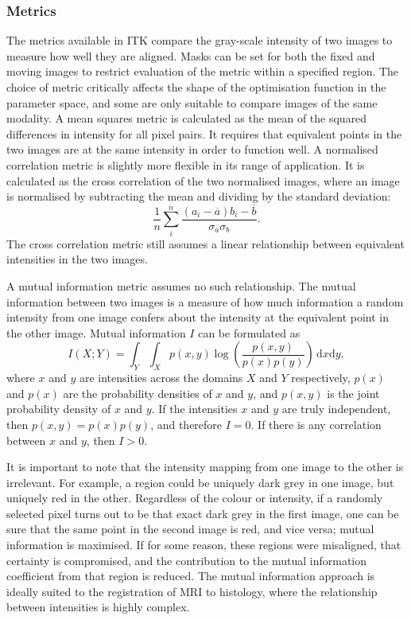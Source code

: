     \subsubsection{Metrics} %
    \label{ssub:metrics}
      The metrics available in ITK compare the gray-scale intensity of two images to measure how well they are aligned. Masks can be set for both the fixed and moving images to restrict evaluation of the metric within a specified region. The choice of metric critically affects the shape of the optimisation function in the parameter space, and some are only suitable to compare images of the same modality. A mean squares metric is calculated as the mean of the squared differences in intensity for all pixel pairs. It requires that equivalent points in the two images are at the same intensity in order to function well. A normalised correlation metric is slightly more flexible in its range of application. It is calculated  as the cross correlation of the two normalised images, where an image is normalised by subtracting the mean and dividing by the standard deviation:
      \begin{equation}
        \frac{1}{n}\sum_{i}^n\frac{(a_i - \overline{a})b_i - \overline{b}}{\sigma_a\sigma_b}.
      \end{equation}
      The cross correlation metric still assumes a linear relationship between equivalent intensities in the two images.
      
      A mutual information metric assumes no such relationship. The mutual information between two images is a measure of how much information a random intensity from one image confers about the intensity at the equivalent point in the other image. Mutual information $I$ can be formulated as
      \begin{equation}
        I(X;Y) = \int_{Y}\int_{X}p(x,y)\log\left(\frac{p(x,y)}{p(x)p(y)}\right)\,\mathrm{d}x \mathrm{d}y,
      \end{equation}      
      where $x$ and $y$ are intensities across the domains $X$ and $Y$ respectively, $p(x)$ and $p(x)$ are the probability densities of $x$ and $y$, and $p(x,y)$ is the joint probability density of $x$ and $y$. If the intensities $x$ and $y$ are truly independent, then $p(x,y) = p(x)p(y)$, and therefore $I = 0$. If there is any correlation between $x$ and $y$, then $I > 0$.
      
      It is important to note that the intensity mapping from one image to the other is irrelevant. For example, a region could be uniquely dark grey in one image, but uniquely red in the other. Regardless of the colour or intensity, if a randomly selected pixel turns out to be that exact dark grey in the first image, one can be sure that the same point in the second image is red, and vice versa; mutual information is maximised. If for some reason, these regions were misaligned, that certainty is compromised, and the contribution to the mutual information coefficient from that region is reduced. The mutual information approach is ideally suited to the registration of MRI to histology, where the relationship between intensities is highly complex.
  
